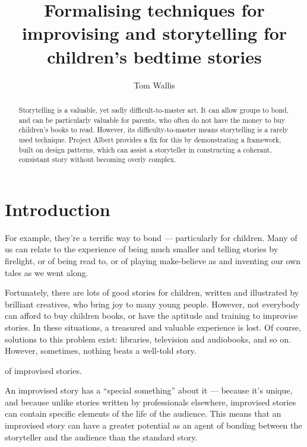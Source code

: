 \documentclass{tufte-handout}
\title{Formalising techniques for improvising and storytelling for children's bedtime stories}
\author[Tom Wallis]{Tom Wallis}
\begin{document}
\maketitle

\begin{abstract}
    Storytelling is a valuable, yet sadly difficult-to-master art. It can allow groups to bond, and can be particularly valuable for parents, who often do not have the money to buy children's books to read.
    However, its difficulty-to-master means storytelling is a rarely used technique. Project Albert provides a fix for this by demonstrating a framework, built on design patterns, which can assist a storyteller in constructing a coherant, consistant story without becoming overly complex.
\end{abstract}

\section{Introduction}
 For example, they're a terrific way to bond --- particularly for children. Many of us can relate to the experience of being much smaller and telling stories by firelight, or of being read to, or of playing make-believe as and inventing our own tales as we went along. \par

Fortunately, there are lots of good stories for children, written and illustrated by brilliant creatives, who bring joy to many young people. However, not everybody can afford to buy children books, or have the aptitude and training to improvise stories. In these situations, a treasured and valuable experience is lost. Of course, solutions to this problem exist: libraries, television and audiobooks, and so on. However, sometimes, nothing beats a well-told story.\par

 of improvised stories. \par
An improvised story has a ``special something'' about it --- because it's unique, and because unlike stories written by professionals elsewhere, improvised stories can contain specific elements of the life of the audience. This means that an improvised story can have a greater potential as an agent of bonding between the storyteller and the audience than the standard story.\par
\end{document}
